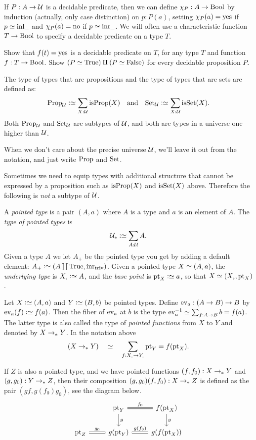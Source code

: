 If $P: A\to{\mathcal{U}}$ is a decidable predicate, then
we can define $\chi_P: A\to\mathrm{Bool}$ by induction (actually,
only case distinction) on $p:P(a)$, setting $\chi_P(a)=\mathrm{yes}$
if $p\jdeq\inl{\_}$ and $\chi_P(a)=\mathrm{no}$ if $p\jdeq\inr{\_}$.
We will often use a characteristic function $T\to\mathrm{Bool}$ to
specify a decidable predicate on a type $T$.

\begin{xca}\label{xca:decidability}
Show that $f(t)=\mathrm{yes}$ is a decidable predicate on $T$,
for any type $T$ and function $f:T\to\mathrm{Bool}$.
Show $(P\simeq\mathrm{True})\amalg(P\simeq\mathrm{False})$ for every decidable
proposition $P$. 
\end{xca}

\begin{definition}\label{def:Prop-Set}
The type of types that are propositions and the 
type of types that are sets are defined as:
\[\Prop_\UU\defeq \sum_{X:\UU}\isprop(X)\quad
\text{and}\quad\Set_\UU\defeq \sum_{X:\UU}\isset(X).\]
Both $\mathrm{Prop}_{\mathcal{U}}$ and $\mathrm{Set}_{\mathcal{U}}$ are subtypes of ${\mathcal{U}}$, and
both are types in a universe one higher than ${\mathcal{U}}$. 
\end{definition}
When we don't care about the precise universe ${\mathcal{U}}$,
we'll leave it out from the notation,
and just write $\mathrm{Prop}$ and $\mathrm{Set}$.

Sometimes we need to equip types with additional structure
that cannot be expressed by a proposition such as
$\mathrm{isProp}(X)$ and $\mathrm{isSet}(X)$ above. 
Therefore the following is \emph{not} a subtype of ${\mathcal{U}}$.

\begin{definition}\label{def:pointedtypes}
 A \emph{pointed type} is a pair $(A,a)$ where $A$ is a type
 and $a$ is an element of $A$. The \emph{type of pointed types} is
\[\UUp \defeq \sum_{A:\UU} A.\]
Given a type $A$ we let $A_+$ be the pointed type you get 
by adding a default element: $A_+\defequi(A\coprod\true,\inr{\triv})$. 
Given a pointed type $X\jdeq(A,a)$, the \emph{underlying type} 
is $X_\div\defeq A$, and the \emph{base point} is $\pt_X\defeq a$, 
so that $X\jdeq (X_\div,\pt_X)$.  

Let $X \defeq (A,a)$ and $Y\defeq(B,b)$ be pointed types. 
Define $\ev_a : (A\to B)\to B$ by $\ev_a(f)\defeq f(a)$. 
Then the fiber of $\ev_a$ at $b$ is the type 
$\ev_a^{-1}\jdeq\sum_{f:A\to B} b=f(a)$. The latter type is also
called the type of \emph{pointed functions} from  $X$ to $Y$
and denoted by $X\to_\ast Y$. In the notation above
\[(X\ptdto Y)\quad\jdeq\quad\sum_{f:X_\div\to Y_\div}\pt_{Y}=f(\pt_X).\]

If $Z$ is also a pointed type, and we have pointed functions
$(f,f_0) : X\to_\ast Y$ and $(g,g_0) : Y\to_\ast Z$, then their composition
$(g,g_0)(f,f_0) : X\to_\ast Z$ is defined as the pair $(gf,g(f_0)g_0)$,
see the diagram below.
\[
\begin{tikzcd} 
           & \pt_Y \arrow[r, equal, "f_0"]\arrow[d, "g"]         & f(\pt_X) \arrow[d, "g"]\\
\pt_Z \arrow[r, equal, "g_0"]      & g(\pt_Y) \arrow[r, equal, "g(f_0)" ] & g(f(\pt_X)) \\
\end{tikzcd}
\]
\end{definition}


